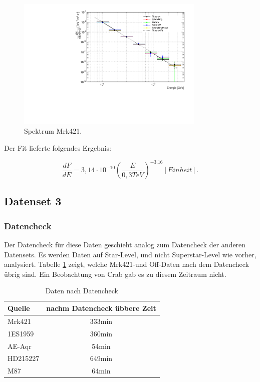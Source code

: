 \begin{figure}
    \centering
    \includegraphics[width=0.8\textwidth]{./Plots/04_MrkAnalyse/Datenset4/Datenset4_Spektrum_Mrk421.pdf}
    \caption{Spektrum Mrk421.}
    \label{Datenset4_Spektrum_Mrk421}
\end{figure}

Der Fit lieferte folgendes Ergebnis:

\begin{equation}
 \frac{dF}{dE}=3,14 \cdot 10^{-10}\left( \frac{E}{0,3 \si{TeV}} \right)^{-3.16} [Einheit].
\end{equation}


\FloatBarrier

\subsection{Datenset 3}
\label{subsec:Datenset_3}

\subsubsection{Datencheck}
Der Datencheck für diese Daten geschieht analog zum Datencheck der anderen Datensets.
Es werden Daten auf Star-Level, und nicht Superstar-Level wie vorher, analysiert.
Tabelle \ref{tab:Datenset3} zeigt, welche Mrk421-und Off-Daten nach dem Datencheck übrig sind.
Ein Beobachtung von Crab gab es zu diesem Zeitraum nicht.

\begin{table}[!h]
\centering
\caption{Daten nach Datencheck}
\label{tab:Datenset3}
\begin{tabular}{lc}
  \toprule
  Quelle & nachm Datencheck übbere Zeit\\
  \midrule
  \midrule
  Mrk421 & 333min\\
  \midrule
  1ES1959 & 360min \\
  AE-Aqr & 54min  \\
  HD215227 & 649min \\
  M87 & 64min \\
  \bottomrule
  \bottomrule
\end{tabular}
\end{table}

